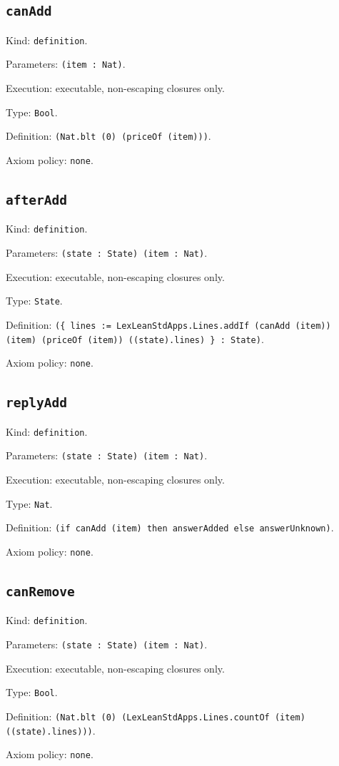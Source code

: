 \documentclass[11pt]{article}
\begin{document}
\subsection*{\texttt{canAdd}}
\noindent Kind: \texttt{definition}.\par
\noindent Parameters: \texttt{(item : Nat)}.\par
\noindent Execution: executable, non-escaping closures only.\par
\noindent Type: \texttt{Bool}.\par
\noindent Definition: \texttt{(Nat.blt (0) (priceOf (item)))}.\par
\noindent Axiom policy: \texttt{none}.\par
\subsection*{\texttt{afterAdd}}
\noindent Kind: \texttt{definition}.\par
\noindent Parameters: \texttt{(state : State) (item : Nat)}.\par
\noindent Execution: executable, non-escaping closures only.\par
\noindent Type: \texttt{State}.\par
\noindent Definition: \texttt{(\{ lines := LexLeanStdApps.Lines.addIf (canAdd (item)) (item) (priceOf (item)) ((state).lines) \} : State)}.\par
\noindent Axiom policy: \texttt{none}.\par
\subsection*{\texttt{replyAdd}}
\noindent Kind: \texttt{definition}.\par
\noindent Parameters: \texttt{(state : State) (item : Nat)}.\par
\noindent Execution: executable, non-escaping closures only.\par
\noindent Type: \texttt{Nat}.\par
\noindent Definition: \texttt{(if canAdd (item) then answerAdded else answerUnknown)}.\par
\noindent Axiom policy: \texttt{none}.\par
\subsection*{\texttt{canRemove}}
\noindent Kind: \texttt{definition}.\par
\noindent Parameters: \texttt{(state : State) (item : Nat)}.\par
\noindent Execution: executable, non-escaping closures only.\par
\noindent Type: \texttt{Bool}.\par
\noindent Definition: \texttt{(Nat.blt (0) (LexLeanStdApps.Lines.countOf (item) ((state).lines)))}.\par
\noindent Axiom policy: \texttt{none}.\par
\end{document}
